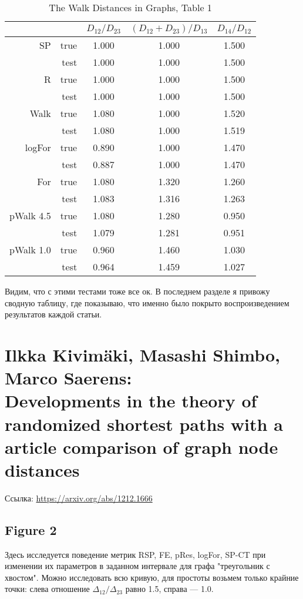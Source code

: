 \documentclass{article}
\begin{document}
\begin{table}[H]
\centering
\caption{The Walk Distances in Graphs, Table 1}
\label{my-label}
\begin{tabular}{rr|ccc}
          &      & $D_{12} / D_{23}$ & $(D_{12}+D_{23}) / D_{13}$ & $D_{14} / D_{12}$ \\
          \hline
SP        & true & 1.000 & 1.000 & 1.500 \\
          & test & 1.000 & 1.000 & 1.500 \\
          \hline
R         & true & 1.000 & 1.000 & 1.500 \\
          & test & 1.000 & 1.000 & 1.500 \\
          \hline
Walk      & true & 1.080 & 1.000 & 1.520 \\
          & test & 1.080 & 1.000 & 1.519 \\
          \hline
logFor    & true & 0.890 & 1.000 & 1.470 \\
          & test & 0.887 & 1.000 & 1.470 \\
          \hline
For       & true & 1.080 & 1.320 & 1.260 \\
          & test & 1.083 & 1.316 & 1.263 \\
          \hline
pWalk 4.5 & true & 1.080 & 1.280 & 0.950 \\
          & test & 1.079 & 1.281 & 0.951 \\
          \hline
pWalk 1.0 & true & 0.960 & 1.460 & 1.030 \\
          & test & 0.964 & 1.459 & 1.027 
\end{tabular}
\end{table}

Видим, что с этими тестами тоже все ок. В последнем разделе я привожу сводную таблицу, где показываю, что именно было покрыто воспроизведением результатов каждой статьи.


\section{Ilkka Kivim{\"a}ki, Masashi Shimbo, Marco Saerens:\\
         Developments in the theory of randomized shortest paths with a article comparison of graph node distances}
Ссылка: \url{https://arxiv.org/abs/1212.1666}

\subsection{Figure 2}
Здесь исследуется поведение метрик RSP, FE, pRes, logFor, SP-CT при изменении их параметров в заданном интервале для графа "треугольник с хвостом". Можно исследовать всю кривую, для простоты возьмем только крайние точки: слева отношение $\Delta_{12}/\Delta_{23}$ равно 1.5, справа --- 1.0.
\end{document}
